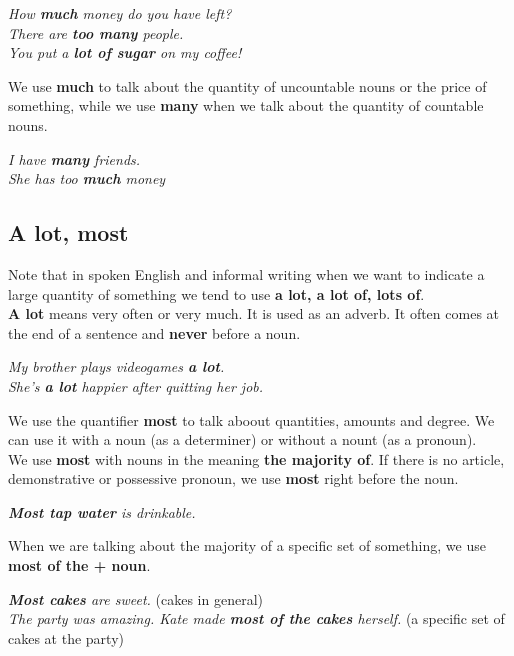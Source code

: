 \documentclass[hidelinks,10pt,a4paper]{article}
\begin{document}
\begin{center}
	\textit{How \textbf{much} money do you have left? \\
	There are \textbf{too many} people. \\
	You put a \textbf{lot of sugar} on my coffee! }
\end{center}

We use \textbf{much} to talk about the quantity of uncountable nouns or the price of something, while we use \textbf{many} when we talk about the quantity of countable nouns.
\begin{center}
	\textit{I have \textbf{many} friends. \\
	She has too \textbf{much}  money }
\end{center}

\subsection{A lot, most}
Note that in spoken English and informal writing when we want to indicate a large quantity of something we tend to use \textbf{ a lot, a lot of, lots of}.\\

\textbf{A lot} means very often or very much. It is used as an adverb. It often comes at the end of a sentence and \textbf{never} before a noun.

\begin{center}
	\textit{My brother plays videogames \textbf{a lot}. \\
	She's \textbf{a lot} happier after quitting her job. }
\end{center}

We use the quantifier \textbf{most} to talk aboout quantities, amounts and degree. We can use it with a noun (as a determiner) or without a nount (as a pronoun). \\
\newpage
We use \textbf{most} with nouns in the meaning \textbf{the majority of}. If there is no article, demonstrative or possessive pronoun, we use \textbf{most} right before the noun.
 \begin{center}
 	\textit{ \textbf{Most tap water} is drinkable. }
 \end{center}

When we are talking about the majority of a specific set of something, we use \textbf{most of the + noun}.

\begin{center}
	\textit{ \textbf{Most cakes} are sweet. } (cakes in general) \\
	\textit{ The party was amazing. Kate made \textbf{most of the cakes} herself. } (a specific set of cakes at the party)
\end{center}
\end{document}
